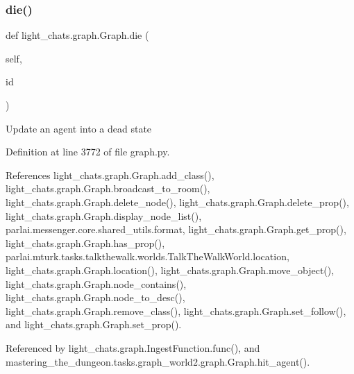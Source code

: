 \subsubsection{\texorpdfstring{die()}{die()}}
{\footnotesize\ttfamily def light\+\_\+chats.\+graph.\+Graph.\+die (\begin{DoxyParamCaption}\item[{}]{self,  }\item[{}]{id }\end{DoxyParamCaption})}

\begin{DoxyVerb}Update an agent into a dead state\end{DoxyVerb}
 

Definition at line 3772 of file graph.\+py.



References light\+\_\+chats.\+graph.\+Graph.\+add\+\_\+class(), light\+\_\+chats.\+graph.\+Graph.\+broadcast\+\_\+to\+\_\+room(), light\+\_\+chats.\+graph.\+Graph.\+delete\+\_\+node(), light\+\_\+chats.\+graph.\+Graph.\+delete\+\_\+prop(), light\+\_\+chats.\+graph.\+Graph.\+display\+\_\+node\+\_\+list(), parlai.\+messenger.\+core.\+shared\+\_\+utils.\+format, light\+\_\+chats.\+graph.\+Graph.\+get\+\_\+prop(), light\+\_\+chats.\+graph.\+Graph.\+has\+\_\+prop(), parlai.\+mturk.\+tasks.\+talkthewalk.\+worlds.\+Talk\+The\+Walk\+World.\+location, light\+\_\+chats.\+graph.\+Graph.\+location(), light\+\_\+chats.\+graph.\+Graph.\+move\+\_\+object(), light\+\_\+chats.\+graph.\+Graph.\+node\+\_\+contains(), light\+\_\+chats.\+graph.\+Graph.\+node\+\_\+to\+\_\+desc(), light\+\_\+chats.\+graph.\+Graph.\+remove\+\_\+class(), light\+\_\+chats.\+graph.\+Graph.\+set\+\_\+follow(), and light\+\_\+chats.\+graph.\+Graph.\+set\+\_\+prop().



Referenced by light\+\_\+chats.\+graph.\+Ingest\+Function.\+func(), and mastering\+\_\+the\+\_\+dungeon.\+tasks.\+graph\+\_\+world2.\+graph.\+Graph.\+hit\+\_\+agent().

